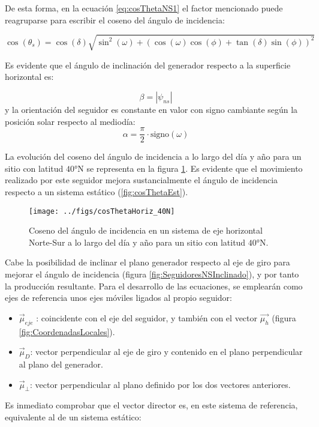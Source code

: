 De esta forma, en la ecuación \eqref{eq:cosThetaNS1} el factor
mencionado puede reagruparse para escribir el coseno del ángulo de
incidencia:

\begin{equation}
\cos(\theta_{s})=\cos(\delta)\sqrt{\sin^{2}(\omega)+\left(\cos(\omega)\cos(\phi)+\tan(\delta)\sin(\phi)\right)^{2}}\label{eq:cosThetaNS_Final}\end{equation}


Es evidente que el ángulo de inclinación del generador respecto a
la superficie horizontal es:

\begin{equation}
\beta=\left|\psi_{ns}\right|\label{eq:BetaNS}\end{equation}
y la orientación del seguidor es constante en valor con signo cambiante
según la posición solar respecto al mediodía:\begin{equation}
\alpha=\frac{\pi}{2}\cdot\mathrm{signo}(\omega)\end{equation}

La evolución del coseno del ángulo de incidencia a lo largo del día
y año para un sitio con latitud $\ang{40}\mathrm{N}$ se representa
en la figura \ref{fig:cosThetaHoriz}. Es evidente que el movimiento
realizado por este seguidor mejora sustancialmente el ángulo de incidencia
respecto a un sistema estático (\ref{fig:cosThetaEst}).

%
\begin{figure}
\texttt{[image: ../figs/cosThetaHoriz\_40N]}

\caption{Coseno del ángulo de incidencia en un sistema de eje horizontal Norte-Sur
a lo largo del día y año para un sitio con latitud $\ang{40}\mathrm{N}$.\label{fig:cosThetaHoriz}}

\end{figure}


Cabe la posibilidad de inclinar el plano generador respecto al eje
de giro para mejorar el ángulo de incidencia (figura \ref{fig:SeguidoresNSInclinado}),
y por tanto la producción resultante. Para el desarrollo de las ecuaciones,
se emplearán como ejes de referencia unos ejes móviles ligados al
propio seguidor:
\begin{itemize}
\item $\vec{\mu}_{eje}$
: coincidente con el eje del seguidor, y también con el vector $\vec{\mu_{h}}$
(figura \ref{fig:CoordenadasLocales}).
\item $\vec{\mu}_{D}$:
vector perpendicular al eje de giro y contenido en el plano perpendicular
al plano del generador.
\item $\vec{\mu}_{\bot}$: vector perpendicular al plano definido por los
dos vectores anteriores.
\end{itemize}
Es inmediato comprobar que el vector director es, en este sistema
de referencia, equivalente al de un sistema estático:

